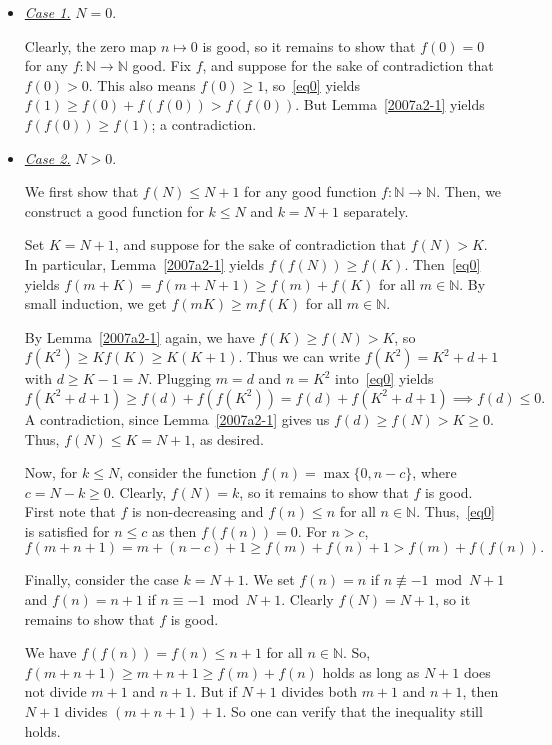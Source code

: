 \documentclass{article}
\newcommand{\N}{\mathbb{N}}
\begin{document}
\begin{itemize}

    \item
    \textit{\underline{Case 1.}}
    $N = 0$.

    Clearly, the zero map $n \mapsto 0$ is good, so it remains to show that $f(0) = 0$ for any $f : \N \to \N$ good.
    Fix $f$, and suppose for the sake of contradiction that $f(0) > 0$.
    This also means $f(0) \geq 1$, so~\eqref{eq0} yields $f(1) \geq f(0) + f(f(0)) > f(f(0))$.
    But Lemma~\ref{2007a2-1} yields $f(f(0)) \geq f(1)$; a contradiction.

    \item
    \textit{\underline{Case 2.}}
    $N > 0$.

    We first show that $f(N) \leq N + 1$ for any good function $f : \N \to \N$.
    Then, we construct a good function for $k \leq N$ and $k = N + 1$ separately.

    Set $K = N + 1$, and suppose for the sake of contradiction that $f(N) > K$.
    In particular, Lemma~\ref{2007a2-1} yields $f(f(N)) \geq f(K)$.
    Then~\eqref{eq0} yields $f(m + K) = f(m + N + 1) \geq f(m) + f(K)$ for all $m \in \N$.
    By small induction, we get $f(mK) \geq m f(K)$ for all $m \in \N$.

    By Lemma~\ref{2007a2-1} again, we have $f(K) \geq f(N) > K$, so $f(K^2) \geq K f(K) \geq K (K + 1)$.
    Thus we can write $f(K^2) = K^2 + d + 1$ with $d \geq K - 1 = N$.
    Plugging $m = d$ and $n = K^2$ into~\eqref{eq0} yields
    \[ f(K^2 + d + 1) \geq f(d) + f(f(K^2)) = f(d) + f(K^2 + d + 1) \implies f(d) \leq 0. \]
    A contradiction, since Lemma~\ref{2007a2-1} gives us $f(d) \geq f(N) > K \geq 0$.
    Thus, $f(N) \leq K = N + 1$, as desired.

    Now, for $k \leq N$, consider the function $f(n) = \max\{0, n - c\}$, where $c = N - k \geq 0$.
    Clearly, $f(N) = k$, so it remains to show that $f$ is good.
    First note that $f$ is non-decreasing and $f(n) \leq n$ for all $n \in \N$.
    Thus,~\eqref{eq0} is satisfied for $n \leq c$ as then $f(f(n)) = 0$.
    For $n > c$,
    \[ f(m + n + 1) = m + (n - c) + 1 \geq f(m) + f(n) + 1 > f(m) + f(f(n)). \]

    Finally, consider the case $k = N + 1$.
    We set $f(n) = n$ if $n \not\equiv -1 \bmod{N + 1}$ and $f(n) = n + 1$ if $n \equiv -1 \bmod{N + 1}$.
    Clearly $f(N) = N + 1$, so it remains to show that $f$ is good.
    
    We have $f(f(n)) = f(n) \leq n + 1$ for all $n \in \N$.
    So, $f(m + n + 1) \geq m + n + 1 \geq f(m) + f(n)$ holds as long as $N + 1$ does not divide $m + 1$ and $n + 1$.
    But if $N + 1$ divides both $m + 1$ and $n + 1$, then $N + 1$ divides $(m + n + 1) + 1$.
    So one can verify that the inequality still holds.

\end{itemize}
\end{document}
